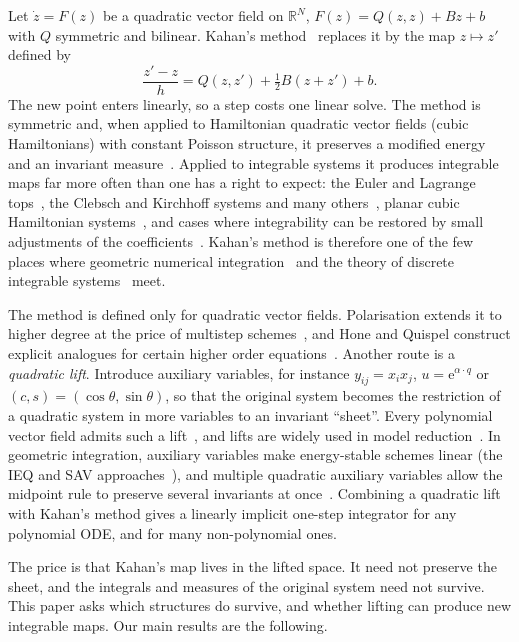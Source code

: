 \documentclass[11pt,a4paper]{article}
\theoremstyle{definition}
\theoremstyle{remark}
\newcommand{\R}{\mathbb{R}}
\begin{document}
Let $\dot z=F(z)$ be a quadratic vector field on $\R^N$, $F(z)=Q(z,z)+Bz+b$ with $Q$ symmetric and bilinear.
Kahan's method~\cite{Kahan93,KahanLi97} replaces it by the map $z\mapsto z'$ defined by
\begin{equation}\label{eq:kahan}
\frac{z'-z}{h}=Q(z,z')+\tfrac12B(z+z')+b .
\end{equation}
The new point enters linearly, so a step costs one linear solve. The method is symmetric and, when applied
to Hamiltonian quadratic vector fields (cubic Hamiltonians) with constant Poisson structure, it preserves a
modified energy and an invariant measure~\cite{CMOQ13}. Applied to integrable systems it produces integrable maps far more often
than one has a right to expect: the Euler and Lagrange tops~\cite{HirotaKimura00,KimuraHirota00}, the
Clebsch and Kirchhoff systems and many others~\cite{PPS09,PPS11,CMMOQ14,PetreraZander17,PSS19}, planar cubic
Hamiltonian systems~\cite{PSS19,GMQ24}, and cases where integrability can be restored by small adjustments of
the coefficients~\cite{PSZ20}. Kahan's method is therefore one of the few places where geometric numerical
integration~\cite{HLW06} and the theory of discrete integrable systems~\cite{Veselov91,Suris03} meet.

The method is defined only for quadratic vector fields. Polarisation extends it to higher degree at the price
of multistep schemes~\cite{CMMOQ15}, and Hone and Quispel construct explicit analogues for certain higher
order equations~\cite{HoneQuispel19}. Another route is a \emph{quadratic lift}. Introduce auxiliary variables,
for instance $y_{ij}=x_ix_j$, $u=\mathrm e^{\alpha\cdot q}$ or $(c,s)=(\cos\theta,\sin\theta)$, so that the
original system becomes the restriction of a quadratic system in more variables to an invariant ``sheet''.
Every polynomial vector field admits such a lift~\cite{Kerner81}, and lifts are widely used in model
reduction~\cite{Gu11,KramerWillcox19,BychkovPogudin21}. In geometric integration, auxiliary variables make
energy-stable schemes linear (the IEQ and SAV approaches~\cite{Yang16,ShenXuYang18}), and multiple quadratic
auxiliary variables allow the midpoint rule to preserve several invariants at once~\cite{Tapley22}.
Combining a quadratic lift with Kahan's method gives a linearly implicit one-step integrator for any
polynomial ODE, and for many non-polynomial ones.

The price is that Kahan's map lives in the lifted space. It need not preserve the sheet, and the integrals
and measures of the original system need not survive. This paper asks which structures do survive, and
whether lifting can produce new integrable maps. Our main results are the following.
\end{document}
